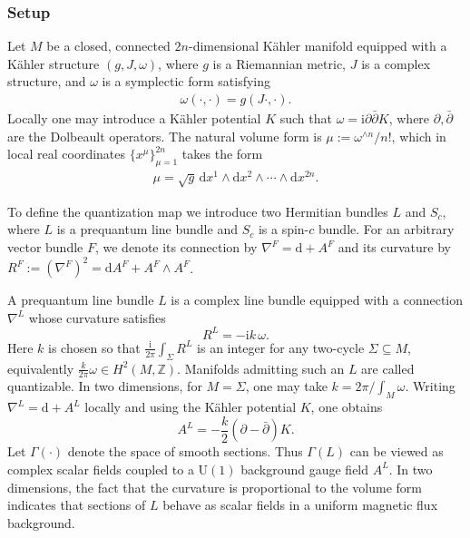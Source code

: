 \documentclass[12pt]{article}
\newcommand{\im}{\mathrm{i}}
\newcommand{\dif}{\mathrm{d}}
\theoremstyle{definition} %
\theoremstyle{plain} %
\theoremstyle{remark} %
\theoremstyle{underline}
\begin{document}
\subsubsection{Setup}

Let \(M\) be a closed, connected \(2n\)-dimensional K\"ahler manifold equipped with a K\"ahler structure \((g,J,\omega)\), where \(g\) is a Riemannian metric, \(J\) is a complex structure, and \(\omega\) is a symplectic form satisfying
\begin{align}
    \label{Kahler}
    \omega(\cdot,\cdot)=g(J\cdot,\cdot).
\end{align}
Locally one may introduce a K\"ahler potential \(K\) such that
\(\omega=\im\partial\bar{\partial}K\), where \(\partial,\bar{\partial}\) are the Dolbeault operators.
The natural volume form is \(\mu:=\omega^{\wedge n}/n!\), which in local real coordinates \(\{x^\mu\}_{\mu=1}^{2n}\) takes the form
\begin{align}
    \mu=\sqrt{g}\,\dif x^1\wedge\dif x^2\wedge\cdots\wedge\dif x^{2n}.
\end{align}

To define the quantization map we introduce two Hermitian bundles \(L\) and \(S_c\), where \(L\) is a prequantum line bundle and \(S_c\) is a spin-\(c\) bundle.
For an arbitrary vector bundle \(F\), we denote its connection by
\(\nabla^F=\dif+A^F\) and its curvature by \(R^F:=(\nabla^F)^2=\dif A^F + A^F\wedge A^F\).

A prequantum line bundle \(L\) is a complex line bundle equipped with a connection \(\nabla^L\) whose curvature satisfies
\[
    R^L=-\im k\,\omega.
\]
Here \(k\) is chosen so that \(\frac{\im}{2\pi}\int_\Sigma R^L\) is an integer for any two-cycle \(\Sigma\subseteq M\), equivalently
\(\frac{k}{2\pi}\omega\in H^2(M,\mathbb{Z})\).
Manifolds admitting such an \(L\) are called quantizable.
In two dimensions, for \(M=\Sigma\), one may take \(k=2\pi/\int_M\omega\). Writing \(\nabla^L=\dif+A^L\) locally and using the K\"ahler potential \(K\), one obtains
\[
    A^L=-\frac{k}{2}(\partial-\bar{\partial})K.
\]
Let \(\Gamma(\cdot)\) denote the space of smooth sections.
Thus \(\Gamma(L)\) can be viewed as complex scalar fields coupled to a \(\mathrm{U}(1)\) background gauge field \(A^L\).
In two dimensions, the fact that the curvature is proportional to the volume form indicates that sections of \(L\) behave as scalar fields in a uniform magnetic flux background.
\end{document}
